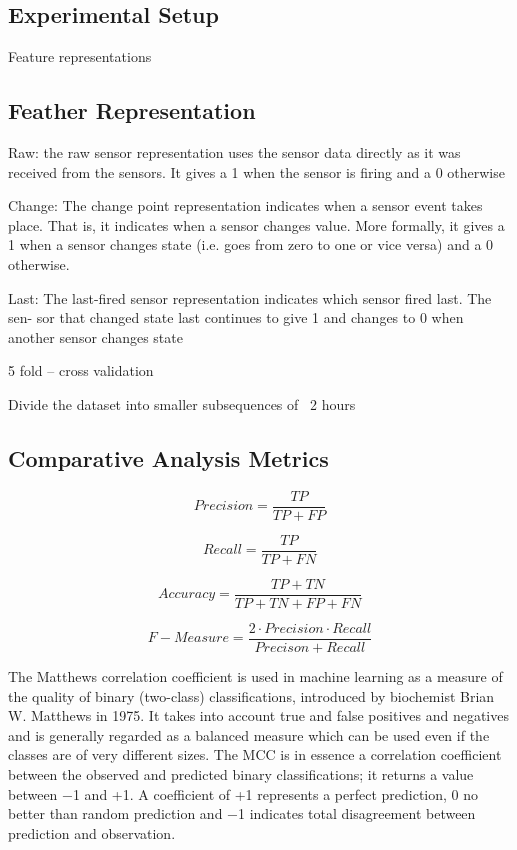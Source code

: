\documentclass[11pt, oneside]{article}   	%
\begin{document}
\subsection{Experimental Setup}

Feature representations




\subsection{Feather Representation}

Raw: the raw sensor representation uses the sensor data directly as it was received from the sensors. It gives a 1 when the sensor is firing and a 0 otherwise 


Change: The change point representation indicates when a sensor event takes place. That is, it indicates when a sensor changes value. More formally, it gives a 1 when a sensor changes state (i.e. goes from zero to one or vice versa) and a 0 otherwise.

Last: The last-fired sensor representation indicates which sensor fired last. The sen- sor that changed state last continues to give 1 and changes to 0 when another sensor changes state 

5 fold – cross validation

Divide the dataset into smaller subsequences of ~2 hours 


\subsection{Comparative Analysis Metrics}

\begin{equation}
Precision = \frac{TP}{TP+FP}
\end{equation}

\begin{equation}
Recall = \frac{TP}{TP+FN}
\end{equation}

\begin{equation}
Accuracy = \frac{TP+TN}{TP+TN+FP+FN}
\end{equation}

\begin{equation}
F-Measure = \frac{2\cdot Precision\cdot Recall}{Precison+Recall}
\end{equation}

The Matthews correlation coefficient is used in machine learning as a measure of the quality of binary (two-class) classifications, introduced by biochemist Brian W. Matthews in 1975. It takes into account true and false positives and negatives and is generally regarded as a balanced measure which can be used even if the classes are of very different sizes. The MCC is in essence a correlation coefficient between the observed and predicted binary classifications; it returns a value between −1 and +1. A coefficient of +1 represents a perfect prediction, 0 no better than random prediction and −1 indicates total disagreement between prediction and observation.
\end{document}
